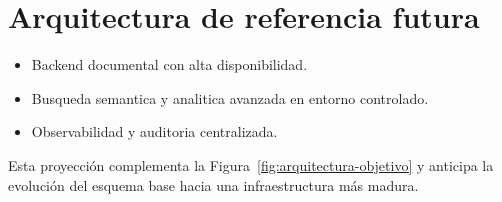 \section{Arquitectura de referencia futura}
\begin{itemize}
  \item Backend documental con alta disponibilidad.
  \item Busqueda semantica y analitica avanzada en entorno controlado.
  \item Observabilidad y auditoria centralizada.
\end{itemize}
Esta proyección complementa la Figura~\ref{fig:arquitectura-objetivo} y anticipa la evolución del esquema base hacia una infraestructura más madura.
